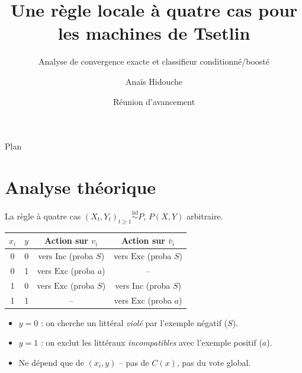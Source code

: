 \documentclass[10pt,aspectratio=169]{beamer}
\title{Une règle locale à quatre cas pour les machines de Tsetlin}
\subtitle{Analyse de convergence exacte et classifieur conditionné/boosté}
\author{Anaïs Hidouche}
\date{Réunion d'avancement}
\newcommand{\Inc}{\ensuremath{\mathrm{Inc}}}
\newcommand{\Exc}{\ensuremath{\mathrm{Exc}}}
\newcommand{\vbar}{\bar{v}}
\begin{document}
\begin{frame}
\titlepage
\end{frame}

\begin{frame}{Plan}
\tableofcontents
\end{frame}

\section{Analyse théorique}

\begin{frame}{La règle à quatre cas}
$(X_t,Y_t)_{t\ge1}\overset{\mathrm{iid}}{\sim}P$, $P(X,Y)$ arbitraire.

\begin{center}
\begin{tabular}{cccc}
\toprule
$x_i$ & $y$ & Action sur $v_i$ & Action sur $\vbar_i$ \\
\midrule
0 & 0 & vers $\Inc$ (proba $S$) & vers $\Exc$ (proba $S$) \\
0 & 1 & vers $\Exc$ (proba $a$) & -- \\
1 & 0 & vers $\Exc$ (proba $S$) & vers $\Inc$ (proba $S$) \\
1 & 1 & -- & vers $\Exc$ (proba $a$) \\
\bottomrule
\end{tabular}
\end{center}
\vspace{4mm}
\begin{itemize}
  \item $y=0$ : on cherche un littéral \emph{violé} par l'exemple négatif ($S$).
  \item $y=1$ : on exclut les littéraux \emph{incompatibles} avec l'exemple positif ($a$).
  \item \alert{Ne dépend que de $(x_i,y)$} -- pas de $C(x)$, pas du vote global.
\end{itemize}
\end{frame}
\end{document}
